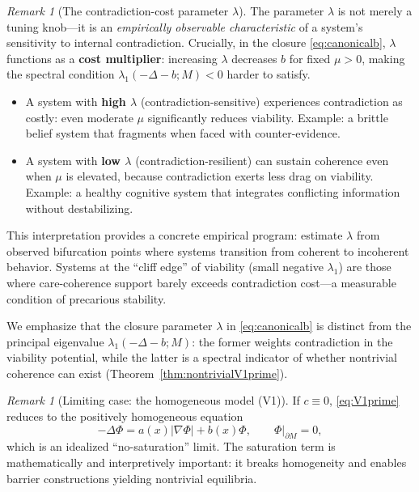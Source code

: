 \documentclass[11pt]{article}
\theoremstyle{plain}
\theoremstyle{definition}
\theoremstyle{remark}
\newtheorem{remark}[theorem]{Remark}
\begin{document}
\begin{remark}[The contradiction-cost parameter \(\lambda\)]\label{rem:lambdaCost}
The parameter \(\lambda\) is not merely a tuning knob---it is an \emph{empirically observable characteristic} of a system's sensitivity to internal contradiction. Crucially, in the closure \eqref{eq:canonicalb}, \(\lambda\) functions as a \textbf{cost multiplier}: increasing \(\lambda\) decreases \(b\) for fixed \(\mu>0\), making the spectral condition \(\lambda_1(-\Delta-b;M)<0\) harder to satisfy.
\begin{itemize}
\item A system with \textbf{high \(\lambda\)} (contradiction-sensitive) experiences contradiction as costly: even moderate \(\mu\) significantly reduces viability. Example: a brittle belief system that fragments when faced with counter-evidence.
\item A system with \textbf{low \(\lambda\)} (contradiction-resilient) can sustain coherence even when \(\mu\) is elevated, because contradiction exerts less drag on viability. Example: a healthy cognitive system that integrates conflicting information without destabilizing.
\end{itemize}
This interpretation provides a concrete empirical program: estimate \(\lambda\) from observed bifurcation points where systems transition from coherent to incoherent behavior. Systems at the ``cliff edge'' of viability (small negative \(\lambda_1\)) are those where care-coherence support barely exceeds contradiction cost---a measurable condition of precarious stability.

We emphasize that the closure parameter \(\lambda\) in \eqref{eq:canonicalb} is distinct from the principal eigenvalue \(\lambda_1(-\Delta-b;M)\): the former weights contradiction in the viability potential, while the latter is a spectral indicator of whether nontrivial coherence can exist (Theorem~\ref{thm:nontrivialV1prime}).
\end{remark}

\begin{remark}[Limiting case: the homogeneous model (V1)]
If \(c\equiv 0\), \eqref{eq:V1prime} reduces to the positively homogeneous equation
\[
-\Delta\Phi = a(x)|\nabla\Phi| + b(x)\Phi,\qquad \Phi|_{\partial M}=0,
\]
which is an idealized ``no-saturation'' limit. The saturation term is mathematically and interpretively important: it breaks homogeneity and enables barrier constructions yielding nontrivial equilibria.
\end{remark}
\end{document}
